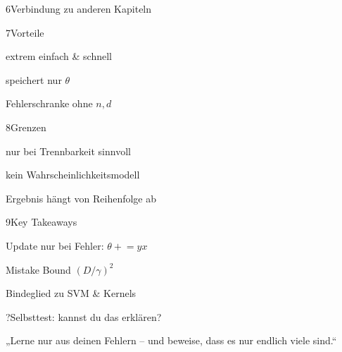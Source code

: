 \begin{hngrid}
\begin{hnp}[raster multicolumn=3,acc=hnrose]{6}{Verbindung zu anderen Kapiteln}
\end{hnp}
%
\begin{hnp}[raster multicolumn=2,acc=hngreen]{7}{Vorteile}
\begin{hnpro}
\item extrem einfach \& schnell
\item speichert nur $\theta$
\item Fehlerschranke ohne $n,d$
\end{hnpro}
\end{hnp}
%
\begin{hnp}[raster multicolumn=2,acc=hnred]{8}{Grenzen}
\begin{hncon}
\item nur bei Trennbarkeit sinnvoll
\item kein Wahrscheinlichkeitsmodell
\item Ergebnis hängt von Reihenfolge ab
\end{hncon}
\end{hnp}
%
\begin{hnp}[raster multicolumn=2,acc=hnorange]{9}{Key Takeaways}
\begin{hnchk}
\item Update nur bei Fehler: $\theta\mathrel{+}=yx$
\item Mistake Bound $(D/\gamma)^2$
\item Bindeglied zu SVM \& Kernels
\end{hnchk}
\end{hnp}
%
\begin{hnp}[raster multicolumn=6,acc=hnpurple,colback=hnlilac!30]{?}{Selbsttest: kannst du das erklären?}
\end{hnp}
%
\begin{hnbanner}[raster multicolumn=6]
„Lerne nur aus deinen Fehlern -- und beweise, dass es nur endlich viele sind.“
\end{hnbanner}
\end{hngrid}
